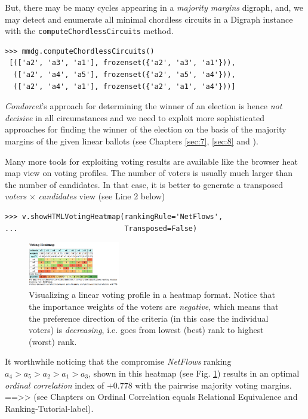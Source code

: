 But, there may be many cycles appearing in a \emph{majority margins} digraph, and, we may detect and enumerate all minimal chordless circuits in a Digraph instance with the \texttt{computeChordlessCircuits} method.

\begin{lstlisting}[basicstyle=\footnotesize]
>>> mmdg.computeChordlessCircuits()
 [(['a2', 'a3', 'a1'], frozenset({'a2', 'a3', 'a1'})), 
  (['a2', 'a4', 'a5'], frozenset({'a2', 'a5', 'a4'})), 
  (['a2', 'a4', 'a1'], frozenset({'a2', 'a1', 'a4'}))]
\end{lstlisting}

\emph{Condorcet}'s approach for determining the winner of an election is hence \emph{not decisive} in all circumstances and we need to exploit more sophisticated approaches for finding the winner of the election on the basis of the majority margins of the given linear ballots (see Chapters \ref{sec:7}, \ref{sec:8} and \citep{BIS-2008a}). 

Many more tools for exploiting voting results are available like the browser heat map view on voting profiles. The number of voters is usually much larger than the number of candidates. In that case, it is better to generate a transposed \emph{voters} $\times$ \emph{candidates} view (see Line 2 below) 

\begin{lstlisting}[basicstyle=\footnotesize]
>>> v.showHTMLVotingHeatmap(rankingRule='NetFlows',
...                         Transposed=False)
\end{lstlisting}

\begin{figure}[h]
\sidecaption
\includegraphics[width=4cm]{Figures/votingHeatmap.png}
\caption{Visualizing a linear voting profile in a heatmap format. Notice that the importance weights of the voters are \emph{negative}, which means that the preference direction of the criteria (in this case the individual voters) is \emph{decreasing}, i.e. goes from lowest (best) rank to highest (worst) rank.
}
\label{fig:7.3}       %
\end{figure}

It worthwhile noticing that the compromise \emph{NetFlows} ranking $a_4 > a_5 > a_2 > a_1 > a_3$, shown in this heatmap (see Fig. \ref{fig:7.3}) results in an optimal \emph{ordinal correlation} index of $+0.778$ with the pairwise majority voting margins.
==>> (see Chapters on Ordinal Correlation equals Relational Equivalence and Ranking-Tutorial-label). 

